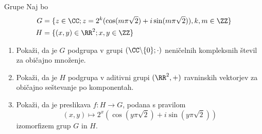 \begin{frame}{Grupe}
	Naj bo
	\begin{align*}
	 G &= \{z \in \CC; z = 2^k (\cos(m\pi\sqrt{2}) + i \sin(m\pi\sqrt{2})), k, m \in \ZZ\} \\
     H &= \{(x, y ) \in \RR^2; x, y \in \ZZ\}
	\end{align*}
	\begin{enumerate}
		\item
			Pokaži, da je $G$ podgrupa v grupi $(\CC \backslash\{0\};\cdot)$
			neničelnih kompleksnih števil za običajno množenje.
		\item
			Pokaži, da je $H$ podgrupa v aditivni grupi $(\RR^2,+)$
			ravninskih vektorjev za običajno seštevanje po komponentah.
		\item
			Pokaži, da je preslikava $f:H\to G$, podana s pravilom
			$$(x,y) \mapsto 2^x (\cos(y\pi\sqrt{2}) + i \sin(y\pi \sqrt{2}))$$
			izomorfizem grup $G$ in $H$.
	\end{enumerate}
\end{frame}



